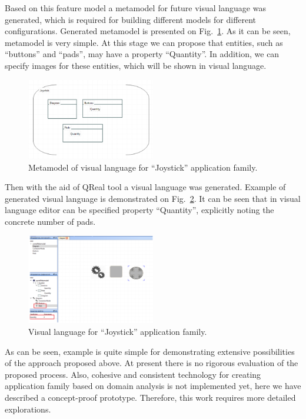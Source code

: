 \documentclass[conference]{IEEEtran}
\begin{document}
Based on this feature model a metamodel for future visual language was generated, which is required for building different models for different configurations. Generated metamodel is presented on Fig.~\ref{image:joystickMetamodel}. As it can be seen, metamodel is very simple. At this stage we can propose that entities, such as ``buttons'' and ``pads'', may have a property ``Quantity''. In addition, we can specify images for these entities, which will be shown in visual language. 

\begin{figure}[H]
	\centering
	\includegraphics[width=0.5\textwidth]{joystickMetamodel.png}
	\caption{Metamodel of visual language for ``Joystick'' application family.}
	\label{image:joystickMetamodel}
\end{figure}

Then with the aid of QReal tool a visual language was generated. Example of generated visual language is demonstrated on Fig.~\ref{image:joystickDsl}. It can be seen that in visual language editor can be specified property ``Quantity'', explicitly noting the concrete number of pads. 

\begin{figure}[H]
	\centering
	\includegraphics[width=0.5\textwidth]{joystickDsl.png}
	\caption{Visual language for ``Joystick'' application family.}
	\label{image:joystickDsl}
\end{figure}

As can be seen, example is quite simple for demonstrating extensive possibilities of the approach proposed above. At present there is no rigorous evaluation of the proposed process. Also, cohesive and consistent technology for creating application family based on domain analysis is not implemented yet, here we have described a concept-proof prototype. Therefore, this work requires more detailed explorations.
\end{document}
